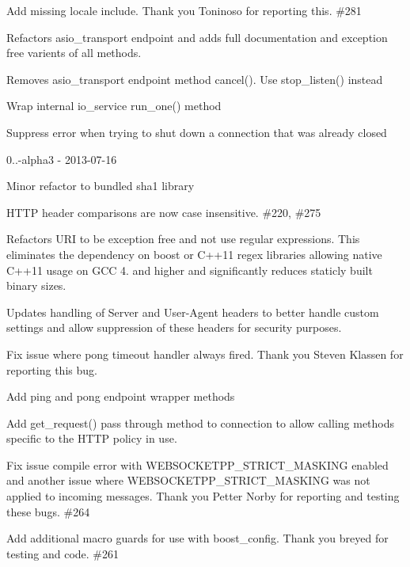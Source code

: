 \begin{DoxyItemize}
\item Add missing locale include. Thank you Toninoso for reporting this. \#281
\item Refactors {\ttfamily asio\+\_\+transport} endpoint and adds full documentation and exception free varients of all methods.
\item Removes {\ttfamily asio\+\_\+transport} endpoint method cancel(). Use {\ttfamily stop\+\_\+listen()} instead
\item Wrap internal {\ttfamily io\+\_\+service} {\ttfamily run\+\_\+one()} method
\item Suppress error when trying to shut down a connection that was already closed
\end{DoxyItemize}

0..-\/alpha3 -\/ 2013-\/07-\/16
\begin{DoxyItemize}
\item Minor refactor to bundled sha1 library
\item HTTP header comparisons are now case insensitive. \#220, \#275
\item Refactors URI to be exception free and not use regular expressions. This eliminates the dependency on boost or C++11 regex libraries allowing native C++11 usage on GCC 4. and higher and significantly reduces staticly built binary sizes.
\item Updates handling of Server and User-\/\+Agent headers to better handle custom settings and allow suppression of these headers for security purposes.
\item Fix issue where pong timeout handler always fired. Thank you Steven Klassen for reporting this bug.
\item Add ping and pong endpoint wrapper methods
\item Add {\ttfamily get\+\_\+request()} pass through method to connection to allow calling methods specific to the HTTP policy in use.
\item Fix issue compile error with {\ttfamily WEBSOCKETPP\+\_\+\+STRICT\+\_\+\+MASKING} enabled and another issue where {\ttfamily WEBSOCKETPP\+\_\+\+STRICT\+\_\+\+MASKING} was not applied to incoming messages. Thank you Petter Norby for reporting and testing these bugs. \#264
\item Add additional macro guards for use with boost\+\_\+config. Thank you breyed for testing and code. \#261
\end{DoxyItemize}

